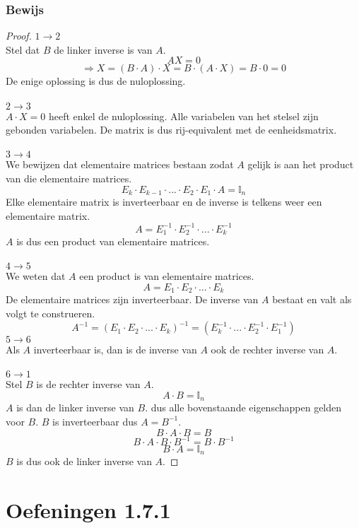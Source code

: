 \documentclass[lineaire_algebra_oplossingen.tex]{subfiles}
\begin{document}
\subsubsection*{Bewijs}
\begin{proof}
\textbf{$1 \rightarrow 2$ }\\
Stel dat $B$ de linker inverse is van $A$.
\[
AX = 0 
\]
\[
\Rightarrow X = (B\cdot A)\cdot X = B \cdot (A\cdot X) = B\cdot 0=0
\]
De enige oplossing is dus de nuloplossing.\\\\
\textbf{$2 \rightarrow 3$ }\\
$A\cdot X = 0$ heeft enkel de nuloplossing. Alle variabelen van het stelsel zijn gebonden variabelen. De matrix is dus rij-equivalent met de eenheidsmatrix.\\\\
\textbf{$3 \rightarrow 4$ }\\
We bewijzen dat elementaire matrices bestaan zodat $A$ gelijk is aan het product van die elementaire matrices.
\[
E_{k}\cdot E_{k-1}\cdot ... \cdot E_{2}\cdot E_{1}\cdot A = \mathbb{I}_{n}
\]
Elke elementaire matrix is inverteerbaar en de inverse is telkens weer een elementaire matrix.
\[
A = E_{1}^{-1}\cdot E_{2}^{-1}\cdot ...\cdot  E_{k}^{-1}
\]
$A$ is dus een product van elementaire matrices.
\\\\
\textbf{$4 \rightarrow 5$ }\\
We weten dat $A$ een product is van elementaire matrices.
\[
A = E_1\cdot E_2 \cdot ... \cdot E_k
\]
De elementaire matrices zijn inverteerbaar. De inverse van $A$ bestaat en valt als volgt te construeren.
\[
A^{-1} = (E_1\cdot E_2 \cdot ... \cdot E_k)^{-1} = (E_k^{-1}\cdot ...\cdot E_2^{-1}\cdot E_1^{-1})
\]
\textbf{$5 \rightarrow 6$ }\\
Als $A$ inverteerbaar is, dan is de inverse van $A$ ook de rechter inverse van $A$.\\\\
\textbf{$6 \rightarrow 1$ }\\
Stel $B$ is de rechter inverse van $A$.
\[
A\cdot B = \mathbb{I}_n
\]
$A$ is dan de linker inverse van $B$. dus alle bovenstaande eigenschappen gelden voor $B$. $B$ is inverteerbaar dus $A = B^{-1}$.
\[
B\cdot A\cdot B = B
\]
\[
B\cdot A \cdot B \cdot B^{-1} = B \cdot B^{-1}
\]
\[
B\cdot A = \mathbb{I}_n
\]
$B$ is dus ook de linker inverse van $A$.
\end{proof}

\section{Oefeningen 1.7.1}
\end{document}
